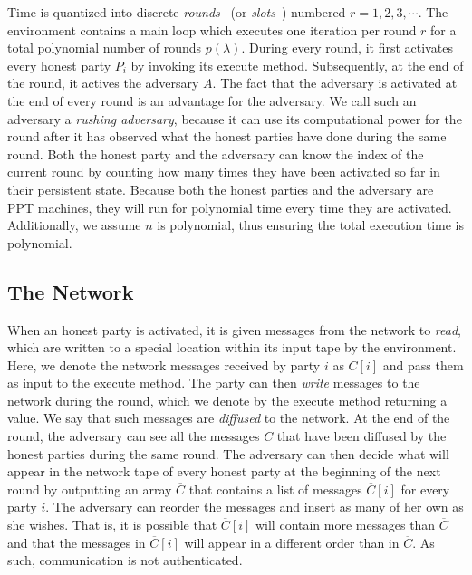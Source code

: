 Time is quantized into discrete \emph{rounds}~\cite{backbone} (or \emph{slots}~\cite{ouroboros}) numbered $r = 1, 2, 3, \cdots$.
The
environment contains a main loop which executes one iteration per round $r$ for
a total polynomial number of rounds $p(\lambda)$. During
every round, it first activates every honest party $P_i$ by invoking its
\textsf{execute} method. Subsequently, at the end of
the round, it actives the adversary $A$. The fact that the adversary is activated at
the end of every round is an advantage for the adversary. We call such an
adversary a \emph{rushing adversary}, because it can use its computational power
for the round after it has observed what the honest parties have done during the
same round. Both the honest party and the adversary can know the index of the
current round by counting how many times they have been activated so far in
their persistent state. Because both the honest parties and the
adversary are PPT machines, they will run for polynomial time every time they
are activated. Additionally, we assume $n$ is polynomial, thus ensuring the
total execution time is polynomial.

\subsection{The Network}

When an honest party is activated, it is given messages from the network to
\emph{read}, which are written to a special location within its input tape by
the environment. Here, we denote the network messages received by party $i$ as
$\overline{C}[i]$ and pass them as input to the \textsf{execute} method. The
party can then \emph{write} messages to the network during the round, which we
denote by the \textsf{execute} method returning a value. We say that such
messages are \emph{diffused} to the network. At the end of the
round, the adversary can see all the messages $C$ that have been diffused by the
honest parties during the same round. The adversary can then decide what will
appear in the network tape of every honest party at the beginning of the next
round by outputting an array $\overline{C}$ that contains a list of messages
$\overline{C}[i]$ for every party $i$. The adversary can reorder the messages and
insert as many of her own as she wishes. That is, it is possible that
$\overline{C}[i]$ will contain more messages than $\overline{C}$ and that the
messages in $\overline{C}[i]$ will appear in a different order than in
$\overline{C}$. As such, communication is not authenticated.

